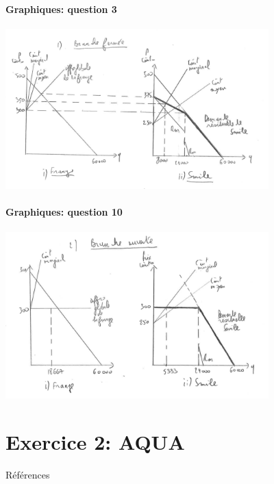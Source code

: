   \begin{frame}[allowframebreaks]{\insertsection}
   \framesubtitle{Graphiques: question 3}
   \begin{center}
   \includegraphics[width=4in]{figq3.png}
   \end{center}
   \end{frame}
   
   \begin{frame}[allowframebreaks]{\insertsection}
   \framesubtitle{Graphiques:  question 10}
   \begin{center}
   \includegraphics[width=4in]{figq10.png}
   \end{center}
   \end{frame}
   
 \section{Exercice 2:  AQUA}
 \frame{\sectionpage}
\begin{frame}[allowframebreaks]{Références}


\end{frame}


